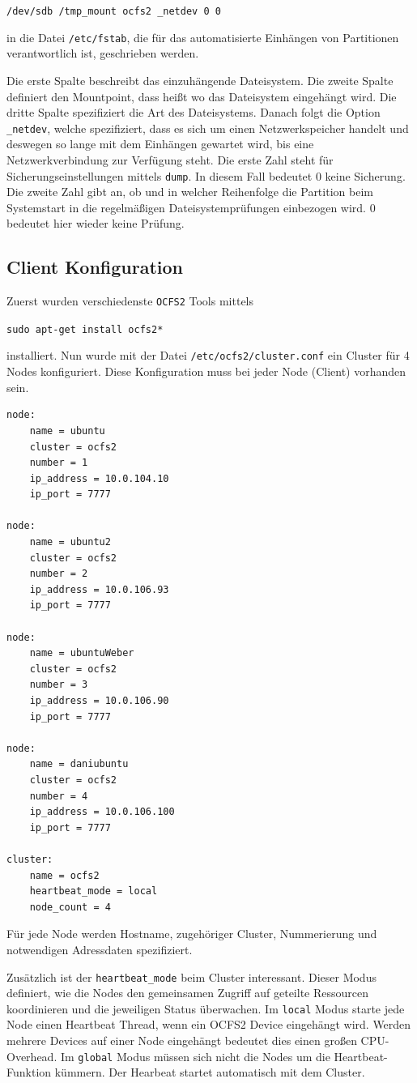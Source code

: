 \texttt{/dev/sdb	/tmp\_mount	ocfs2	\_netdev		0	0}

in die Datei \texttt{/etc/fstab}, die für das automatisierte Einhängen von Partitionen verantwortlich ist, geschrieben werden. \cite{ocfs2faq}

Die erste Spalte beschreibt das einzuhängende Dateisystem. Die zweite Spalte definiert den Mountpoint, dass heißt wo das Dateisystem eingehängt wird. Die dritte Spalte spezifiziert die Art des Dateisystems. Danach folgt die Option \texttt{\_netdev}, welche spezifiziert, dass es sich um einen Netzwerkspeicher handelt und deswegen so lange mit dem Einhängen gewartet wird, bis eine Netzwerkverbindung zur Verfügung steht. Die erste Zahl steht für Sicherungseinstellungen mittels \texttt{dump}. In diesem Fall bedeutet 0 keine Sicherung. Die zweite Zahl gibt an, ob und in welcher Reihenfolge die Partition beim Systemstart in die regelmäßigen Dateisystemprüfungen einbezogen wird. 0 bedeutet hier wieder keine Prüfung. \cite{ubuntuusersfstab}
\subsection{Client Konfiguration}
Zuerst wurden verschiedenste \texttt{OCFS2} Tools mittels

\texttt{sudo apt-get install ocfs2*}

installiert.\clearpage
Nun wurde mit der Datei \texttt{/etc/ocfs2/cluster.conf} ein Cluster für 4 Nodes konfiguriert. Diese Konfiguration muss bei jeder Node (Client) vorhanden sein.
\begin{lstlisting}[style=bash, caption=\texttt{/etc/ocfs2/cluster.conf}]
node:
	name = ubuntu
	cluster = ocfs2
	number = 1
	ip_address = 10.0.104.10
	ip_port = 7777

node:
	name = ubuntu2
	cluster = ocfs2
	number = 2
	ip_address = 10.0.106.93
	ip_port = 7777

node:
	name = ubuntuWeber
	cluster = ocfs2
	number = 3
	ip_address = 10.0.106.90
	ip_port = 7777

node:
	name = daniubuntu
	cluster = ocfs2
	number = 4
	ip_address = 10.0.106.100
	ip_port = 7777
	
cluster:
	name = ocfs2
	heartbeat_mode = local
	node_count = 4
\end{lstlisting}
Für jede Node werden Hostname, zugehöriger Cluster, Nummerierung und notwendigen Adressdaten spezifiziert.

Zusätzlich ist der \texttt{heartbeat\_mode} beim Cluster interessant. Dieser Modus definiert, wie die Nodes den gemeinsamen Zugriff auf geteilte Ressourcen koordinieren und die jeweiligen Status überwachen. Im \texttt{local} Modus starte jede Node einen Heartbeat Thread, wenn ein OCFS2 Device eingehängt wird. Werden mehrere Devices auf einer Node eingehängt bedeutet dies einen großen CPU-Overhead. Im \texttt{global} Modus müssen sich nicht die Nodes um die Heartbeat-Funktion kümmern. Der Hearbeat startet automatisch mit dem Cluster. \cite{heartbeat}

